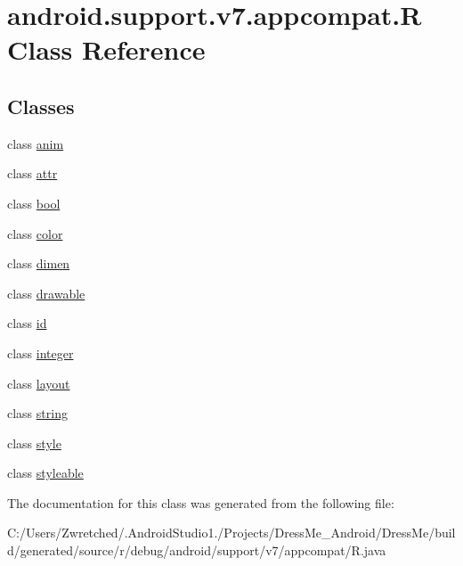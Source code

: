 \hypertarget{classandroid_1_1support_1_1v7_1_1appcompat_1_1_r}{}\section{android.\+support.\+v7.\+appcompat.\+R Class Reference}
\label{classandroid_1_1support_1_1v7_1_1appcompat_1_1_r}
\subsection*{Classes}
\begin{DoxyCompactItemize}
\item 
class \hyperlink{classandroid_1_1support_1_1v7_1_1appcompat_1_1_r_1_1anim}{anim}
\item 
class \hyperlink{classandroid_1_1support_1_1v7_1_1appcompat_1_1_r_1_1attr}{attr}
\item 
class \hyperlink{classandroid_1_1support_1_1v7_1_1appcompat_1_1_r_1_1bool}{bool}
\item 
class \hyperlink{classandroid_1_1support_1_1v7_1_1appcompat_1_1_r_1_1color}{color}
\item 
class \hyperlink{classandroid_1_1support_1_1v7_1_1appcompat_1_1_r_1_1dimen}{dimen}
\item 
class \hyperlink{classandroid_1_1support_1_1v7_1_1appcompat_1_1_r_1_1drawable}{drawable}
\item 
class \hyperlink{classandroid_1_1support_1_1v7_1_1appcompat_1_1_r_1_1id}{id}
\item 
class \hyperlink{classandroid_1_1support_1_1v7_1_1appcompat_1_1_r_1_1integer}{integer}
\item 
class \hyperlink{classandroid_1_1support_1_1v7_1_1appcompat_1_1_r_1_1layout}{layout}
\item 
class \hyperlink{classandroid_1_1support_1_1v7_1_1appcompat_1_1_r_1_1string}{string}
\item 
class \hyperlink{classandroid_1_1support_1_1v7_1_1appcompat_1_1_r_1_1style}{style}
\item 
class \hyperlink{classandroid_1_1support_1_1v7_1_1appcompat_1_1_r_1_1styleable}{styleable}
\end{DoxyCompactItemize}


The documentation for this class was generated from the following file\+:\begin{DoxyCompactItemize}
\item 
C\+:/\+Users/\+Zwretched/.\+Android\+Studio1./\+Projects/\+Dress\+Me\+\_\+\+Android/\+Dress\+Me/build/generated/source/r/debug/android/support/v7/appcompat/R.\+java\end{DoxyCompactItemize}
